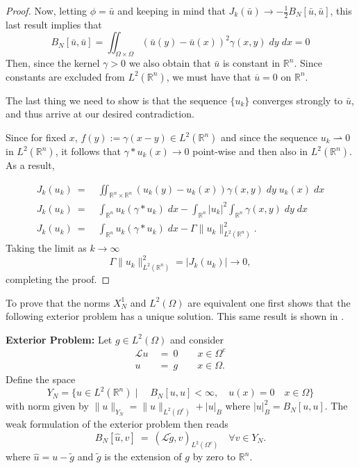 \documentclass[11pt]{amsart}   	%
\theoremstyle{plain}
\numberwithin{equation}{section}
\def\Ga{\Gamma}
\def\La{\Lambda}
\def\Om{\Omega}
\def\R{\mathbb{R}}
\newcommand{\JMS}[1]{{\color{orange} {\bf J. Siktar:} [#1] }}
\begin{document}
\begin{proof}
Now, letting $\phi = \bar{u}$ and keeping in mind that $J_k(\bar{u}) \rightarrow -\frac{1}{2} B_N[\bar{u},\bar{u}]$,
 this last result implies that
\[ B_N[\bar{u},\bar{u}] = \iint_{\Om \times \Om}  (\bar{u}(y) - \bar{u}(x))^2 \gamma(x,y)\;dy \;dx = 0\]
Then, since the kernel $\gamma>0$ we also obtain that $\bar{u}$ is constant in $\R^n$. Since constants are excluded from  
$L^2(\R^n)$, we must have that $\overline{u} = 0$ on $\R^n$.

The last thing we need to show is that the sequence $\{ u_k\}$ converges strongly to $\bar{u}$, and thus arrive at our desired contradiction.


Since for fixed $x$, $f(y):= \gamma(x-y)  \in L^2(\R^n)$ and since the sequence $u_k \rightharpoonup 0$ in $L^2(\R^n)$, it follows that $\gamma \ast u_k(x) \rightarrow 0 $ point-wise and then also in $L^2(\R^n)$. 
As a result,

\begin{align*}
J_k(u_k)\ = \ & \iint_{\R^n \times \R^n} (u_k(y) -u_k(x)) \gamma(x,y) \;dy \; u_k(x) \;dx\\
J_k(u_k) \ = \ & \int_{\R^n} u_k ( \gamma \ast u_k) \;dx - \int_{\R^n} |u_k|^2 \int_{\R^n} \gamma(x,y) \;dy \;dx\\
J_k(u_k) \ = \ &  \int_{\R^n} u_k ( \gamma \ast u_k) \;dx  - \Ga \| u_k\|^2_{L^2(\R^n)}.
\end{align*} 
Taking the limit as $k \rightarrow \infty$
\[   \Ga \| u_k \|^2_{L^2(\R^n)} =|J_k(u_k)| \longrightarrow 0, \]
completing the proof.
\end{proof}

To prove that the norms $X^1_N$ and $L^2(\Omega)$ are equivalent one first shows that the following exterior problem has a unique solution. This same result is shown in \cite{olena2021, cappanera2024analysis}.  

{\bf Exterior Problem:} Let $g\in L^2(\Omega)$ and consider
\begin{equation}\label{e:exterior}
\begin{split}
\mathcal{L} u \ & = \ 0 \qquad x \in \Omega^c\\
u \ & = \ g \qquad x \in \Omega.
\end{split}
\end{equation}
Define the space 
\[Y_N = \{ u \in L^2(\R^n) \mid \quad B_N[u,u]< \infty, \quad u(x) = 0 \quad x\in \Omega\}\]
with norm given by $\|u\|_{Y_N} = \| u\|_{L^2(\Omega^c)} + |u|_B$ where $|u|^2_B = B_N[u,u]$. 
The weak formulation of the exterior problem then reads
\begin{equation}\label{e:weak_exterior}
B_N[\hat{u},v] \ = \ (\mathcal{L} \tilde{g}, v)_{L^2(\Omega^c)} \quad \forall v \in Y_N.
\end{equation}
where $\hat{u} = u-\tilde{g}$ and $\tilde{g}$ is the extension of $g$ by zero to $\R^n$.
\end{document}

